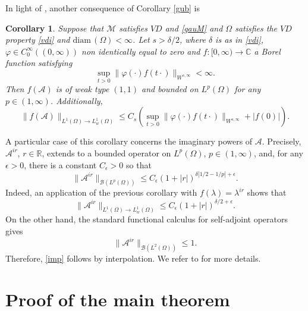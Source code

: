 \documentclass[10pt]{amsart}
\newtheorem{corollary}{Corollary}
\theoremstyle{definition}
\begin{document}
In light of \cite[Theorem 1.3, page 450 and Remark 1, page 451]{DOS}, another consequence of Corollary \ref{gub} is

\begin{corollary}\label{hc}
Suppose that $\mathcal{M}$ satisfies $VD$ and \eqref{gauM} and $\Omega$ satisfies the $VD$ property \eqref{vdi} and $\textrm{diam}\, (\Omega )<\infty$.  Let $s>\delta /2$, where $\delta$ is as in \eqref{vdi}, $\varphi \in C_0^\infty ((0,\infty))$ non identically equal to zero and $f:[0,\infty )\rightarrow \mathbb{C}$ a Borel function satisfying
\[
\sup_{t>0} \| \varphi (\cdot )f(t\cdot )\|_{W^{s,\infty}}<\infty .
\]
Then $f(\mathcal{A})$ is of weak type $(1,1)$  and bounded on $L^p(\Omega )$ for any $p\in (1,\infty )$. Additionally,
\[
\|f(\mathcal{A})\|_{L^1(\Omega )\rightarrow L^1_w(\Omega )}\leq C_s\left( \sup_{t>0} \| \varphi (\cdot )f(t\cdot )\|_{W^{s,\infty}}+|f(0)|\right).
\]
\end{corollary} 

A particular case of this corollary concerns the imaginary powers of $\mathcal{A}$. Precisely, $\mathcal{A}^{ir}$, $r\in \mathbb{R}$, extends to a bounded operator on $L^p(\Omega )$, $p\in (1,\infty )$, and, for any $\epsilon >0$, there is a constant $C_\epsilon >0$ so that
\begin{equation}\label{imp}
\|\mathcal{A}^{ir}\|_{\mathscr{B}(L^p(\Omega ))}\leq C_\epsilon (1+|r|)^{\delta |1/2-1/p|+\epsilon}.
\end{equation}
Indeed, an application of the previous corollary with $f(\lambda) = \lambda^{ir}$ shows that 
\[
\|\mathcal{A}^{ir} \|_{L^1(\Omega )\rightarrow L^1_w(\Omega )}\leq C_\epsilon (1+|r|)^{\delta/2 +\epsilon}.
\]
On the other hand, the standard functional calculus for  self-adjoint operators gives
 \[
\|\mathcal{A}^{ir}\|_{\mathscr{B}(L^2(\Omega ))}\leq 1.
\]
Therefore, \eqref{imp} follows by interpolation. We refer to \cite[Corollary 7.24, page 239]{Ou} for more details. 

\section{Proof of the main theorem}\label{section2}
\end{document}
